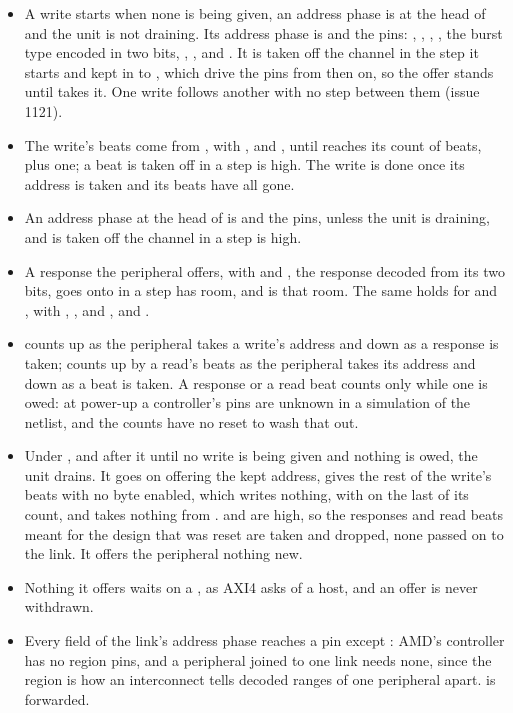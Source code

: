 \begin{itemize}
\item A write starts when none is being given, an address phase is at
the head of  and the unit is not draining. Its address phase
is  and the  pins: , ,
, , the burst type encoded in two bits,
, ,  and . It is
taken off the channel in the step it starts and kept in 
to , which drive the pins from then on, so the offer
stands until  takes it. One write follows another with
no step between them (issue 1121).
\item The write's beats come from ,  with
,  and , until  reaches
its count of beats,  plus one; a beat is taken off
 in a step  is high. The write is done once its
address is taken and its beats have all gone.
\item An address phase at the head of  is  and
the  pins, unless the unit is draining, and is taken off the
channel in a step  is high.
\item A response the peripheral offers,  with
 and , the response decoded from its two bits,
goes onto  in a step  has room, and  is
that room. The same holds for  and , with
, ,  and , and
.
\item {} counts up as the peripheral takes a write's address
and down as a response is taken;  counts up by a read's
beats as the peripheral takes its address and down as a beat is taken.
A response or a read beat counts only while one is owed: at power-up a
controller's pins are unknown in a simulation of the netlist, and the
counts have no reset to wash that out.
\item Under , and after it until no write is being given and
nothing is owed, the unit drains. It goes on offering the kept
address, gives the rest of the write's beats with no byte enabled,
which writes nothing, with  on the last of its count, and
takes nothing from .  and  are high,
so the responses and read beats meant for the design that was reset
are taken and dropped, none passed on to the link. It offers the
peripheral nothing new.
\item Nothing it offers waits on a , as AXI4 asks of a
host, and an offer is never withdrawn.
\item Every field of the link's address phase reaches a pin except
: AMD's controller has no region pins, and a peripheral
joined to one link needs none, since the region is how an interconnect
tells decoded ranges of one peripheral apart.  is forwarded.
\end{itemize}

